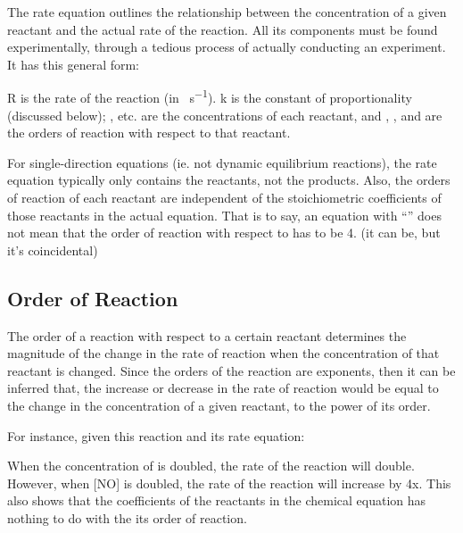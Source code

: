 		\pagebreak

		The rate equation outlines the relationship between the concentration of a given reactant and the actual rate of the reaction.
		All its components must be found experimentally, through a tedious process of actually conducting an experiment. It has this
		general form:


		R is the rate of the reaction (in \si{\molarConc\per\second}). k is the constant of proportionality
		(discussed below); \itl{[A]}, \itl{[B]} etc. are the concentrations of each reactant, and , , and
		 are the orders of reaction with respect to that reactant.

		For single-direction equations (ie. not dynamic equilibrium reactions), the rate equation typically only contains the reactants, not
		the products. Also, the orders of reaction of each reactant are independent of the stoichiometric coefficients of those reactants in
		the actual equation. That is to say, an equation with ``'' does not mean that the order of reaction with respect to
		 has to be 4. (it can be, but it's coincidental)



		\subsection{Order of Reaction}

			The order of a reaction with respect to a certain reactant determines the magnitude of the change in the rate of reaction when the
			concentration of that reactant is changed. Since the orders of the reaction are exponents, then it can be inferred that, the
			increase or decrease in the rate of reaction would be equal to the change in the concentration of a given reactant, to the power
			of its order.

			For instance, given this reaction and its rate equation:


			When the concentration of  is doubled, the rate of the reaction will double. However, when [NO] is doubled, the rate of the
			reaction will increase by 4x. This also shows that the coefficients of the reactants in the chemical equation has nothing to do
			with the its order of reaction.

